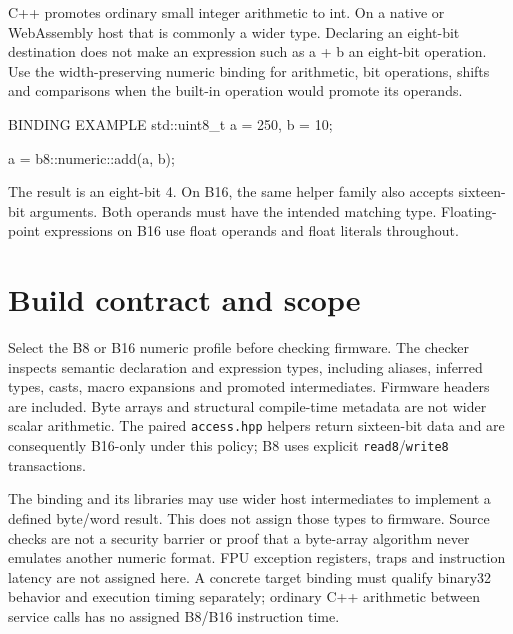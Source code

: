\documentclass[10pt]{article}
\begin{document}
C++ promotes ordinary small integer arithmetic to int. On a native or WebAssembly host that is commonly a wider type. Declaring an eight-bit destination does not make an expression such as a + b an eight-bit operation. Use the width-preserving numeric binding for arithmetic, bit operations, shifts and comparisons when the built-in operation would promote its operands.
\begin{Notice}{BINDING EXAMPLE}
\textsf{std::uint8\_t a = 250, b = 10;}\par
\textsf{a = b8::numeric::add(a, b);}\par
The result is an eight-bit 4. On B16, the same helper family also accepts sixteen-bit arguments. Both operands must have the intended matching type. Floating-point expressions on B16 use float operands and float literals throughout.
\end{Notice}
\section*{Build contract and scope}
Select the B8 or B16 numeric profile before checking firmware. The checker inspects semantic declaration and expression types, including aliases, inferred types, casts, macro expansions and promoted intermediates. Firmware headers are included. Byte arrays and structural compile-time metadata are not wider scalar arithmetic. The paired \texttt{access.hpp} helpers return sixteen-bit data and are consequently B16-only under this policy; B8 uses explicit \texttt{read8}/\texttt{write8} transactions.

The binding and its libraries may use wider host intermediates to implement a defined byte/word result. This does not assign those types to firmware. Source checks are not a security barrier or proof that a byte-array algorithm never emulates another numeric format. FPU exception registers, traps and instruction latency are not assigned here. A concrete target binding must qualify binary32 behavior and execution timing separately; ordinary C++ arithmetic between service calls has no assigned B8/B16 instruction time.
\vfill{}
\end{document}
